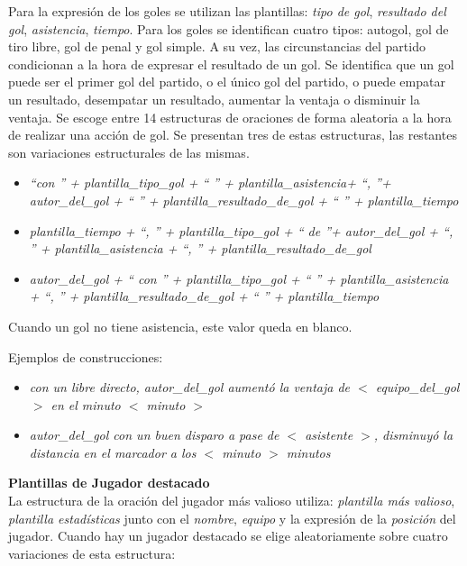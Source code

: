     Para la expresión de los goles se utilizan las plantillas: \textit{tipo de gol}, \textit{resultado del gol}, 
    \textit{asistencia}, \textit{tiempo}. Para los goles se identifican cuatro tipos: autogol, gol de tiro libre, 
    gol de penal y gol simple. A su vez, las circunstancias del partido condicionan a la hora de expresar el resultado 
    de un gol. Se identifica que un gol puede ser el primer gol del partido, o el único gol del partido, o puede empatar 
    un resultado, desempatar un resultado, aumentar la ventaja o disminuir la ventaja.
    Se escoge entre 14 estructuras de oraciones de forma aleatoria a la hora de realizar una acción de gol. Se presentan tres 
    de estas estructuras, las restantes son variaciones estructurales de las mismas.
    

    \begin{itemize}
        \item \textit{ “con ” + plantilla\_tipo\_gol + “ ” + plantilla\_asistencia+ “, ”+ autor\_del\_gol + “ ” + plantilla\_resultado\_de\_gol + “ ” + plantilla\_tiempo}
        \item \textit{plantilla\_tiempo + “, ” + plantilla\_tipo\_gol + “ de ”+ autor\_del\_gol + “, ” + plantilla\_asistencia + “, ” + plantilla\_resultado\_de\_gol}
        \item \textit{autor\_del\_gol + “ con ” + plantilla\_tipo\_gol + “ ” + plantilla\_asistencia + “, ” + plantilla\_resultado\_de\_gol + “ ” + plantilla\_tiempo}
    \end{itemize}

    Cuando un gol no tiene asistencia, este valor queda en blanco.

    Ejemplos de construcciones:

    \begin{itemize}
        \item \textit{con un libre directo, autor\_del\_gol aumentó la ventaja de $<$ equipo\_del\_gol $>$ en el minuto $<$ minuto $>$}
        \item \textit{autor\_del\_gol con un buen disparo a pase de $<$ asistente $>$, disminuyó la distancia en el marcador a los $<$ minuto $>$ minutos} 
    \end{itemize}

\textbf{Plantillas de Jugador destacado}\\

    La estructura de la oración del jugador más valioso utiliza: \textit{plantilla más valioso}, \textit{plantilla estadísticas} junto con el \textit{nombre}, 
\textit{equipo} y la expresión de la  \textit{posición} del jugador.
    Cuando hay un jugador destacado se elige aleatoriamente sobre cuatro variaciones de esta estructura:
    
